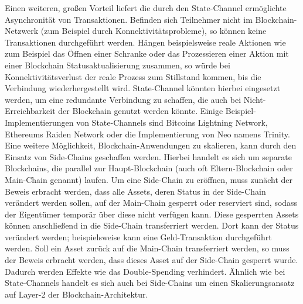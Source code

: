 Einen weiteren, großen Vorteil liefert die durch den State-Channel ermöglichte Asynchronität von Transaktionen. Befinden sich Teilnehmer nicht im Blockchain-Netzwerk (zum Beispiel durch Konnektivitätsprobleme), so können keine Transaktionen durchgeführt werden. Hängen beispielsweise reale Aktionen wie zum Beispiel das Öffnen einer Schranke oder das Prozessieren einer Aktion mit einer Blockchain Statusaktualisierung zusammen, so würde bei Konnektivitätsverlust der reale Prozess zum Stillstand kommen, bis die Verbindung wiederhergestellt wird. State-Channel könnten hierbei eingesetzt werden, um eine redundante Verbindung zu schaffen, die auch bei Nicht-Erreichbarkeit der Blockchain genutzt werden könnte. Einige Beispiel-Implementierungen von State-Channels sind Bitcoins Lightning Network, Ethereums Raiden Network oder die Implementierung von Neo namens Trinity.\\
Eine weitere Möglichkeit, Blockchain-Anwendungen zu skalieren, kann durch den Einsatz von Side-Chains geschaffen werden. Hierbei handelt es sich um separate Blockchains, die parallel zur Haupt-Blockchain (auch oft Eltern-Blockchain oder Main-Chain genannt) laufen. Um eine Side-Chain zu eröffnen, muss zunächt der Beweis erbracht werden, dass alle Assets, deren Status in der Side-Chain verändert werden sollen, auf der Main-Chain gesperrt oder reserviert sind, sodass der Eigentümer temporär über diese nicht verfügen kann. Diese gesperrten Assets können anschließend in die Side-Chain transferriert werden. Dort kann der Status verändert werden; beispielsweise kann eine Geld-Transaktion durchgeführt werden. Soll ein Asset zurück auf die Main-Chain transferriert werden, so muss der Beweis erbracht werden, dass dieses Asset auf der Side-Chain gesperrt wurde. Dadurch werden Effekte wie das Double-Spending verhindert. Ähnlich wie bei State-Channels handelt es sich auch bei Side-Chains um einen Skalierungsansatz auf Layer-2 der Blockchain-Architektur.


